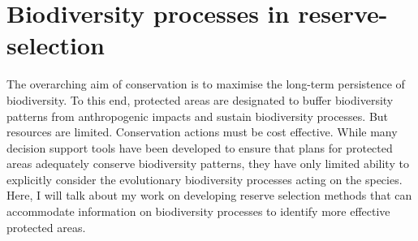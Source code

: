 \documentclass[10pt, a4paper, fleqn]{article}
\begin{document}
\section{Biodiversity processes in reserve-selection}
\begin{normalsize}
The overarching aim of conservation is to maximise the long-term persistence of biodiversity. To this end, protected areas are designated to buffer biodiversity patterns from anthropogenic impacts and sustain biodiversity processes. But resources are limited. Conservation actions must be cost effective. While many decision support tools have been developed to ensure that plans for protected areas adequately conserve biodiversity patterns, they have only limited ability to explicitly consider the evolutionary biodiversity processes acting on the species. Here, I will talk about my work on developing reserve selection methods that can accommodate information on biodiversity processes to identify more effective protected areas.
\end{normalsize}
\end{document}
